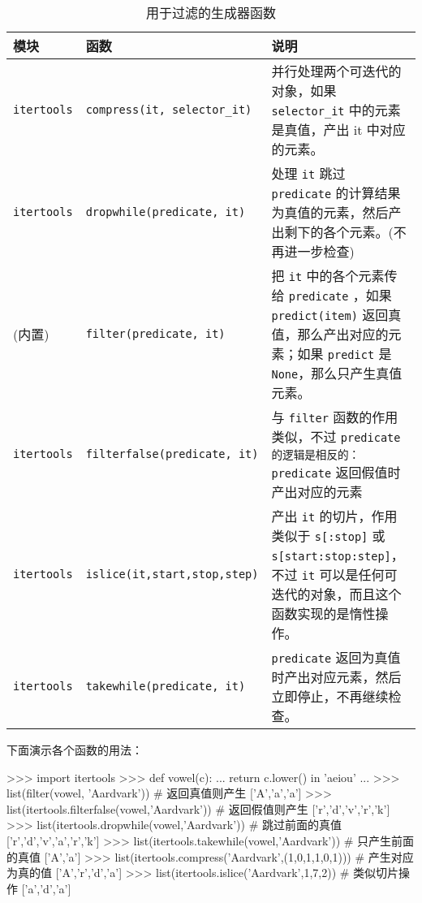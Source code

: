 \begin{table}[H]
    \centering
    \caption{用于过滤的生成器函数}
    \label{table:用于过滤的生成器函数}
    \setlength{\tabcolsep}{2mm}
    \small
    \begin{tabular}{l|l|p{9cm}}
        \toprule
        \textbf{模块} & \textbf{函数} & \textbf{说明} \\
        \midrule
        \texttt{itertools} & \texttt{compress(it, selector\_it)} & 并行处理两个可迭代的对象，如果 \texttt{selector\_it} 中的元素是真值，产出 it 中对应的元素。 \\
        \midrule
        \texttt{itertools} & \texttt{dropwhile(predicate, it)} & 处理 \texttt{it} 跳过 \texttt{predicate} 的计算结果为真值的元素，然后产出剩下的各个元素。(不再进一步检查) \\
        \midrule
        (内置) & \texttt{filter(predicate, it)} & 把 \texttt{it} 中的各个元素传给 \texttt{predicate} ，如果 \texttt{predict(item)} 返回真值，那么产出对应的元素；如果 \texttt{predict} 是 \texttt{None}，那么只产生真值元素。\\
        \midrule
        \texttt{itertools} & \texttt{filterfalse(predicate, it)} & 与 \texttt{filter} 函数的作用类似，不过 \texttt{predicate} \texttt{的逻辑是相反的：predicate} 返回假值时产出对应的元素 \\
        \midrule
        \texttt{itertools} & \texttt{islice(it,start,stop,step)} &  产出 \texttt{it} 的切片，作用类似于 \texttt{s[:stop]} 或 \texttt{s[start:stop:step]}，不过 \texttt{it} 可以是任何可迭代的对象，而且这个函数实现的是惰性操作。 \\
        \midrule
        \texttt{itertools} & \texttt{takewhile(predicate, it)} & \texttt{predicate} 返回为真值时产出对应元素，然后立即停止，不再继续检查。 \\
        \bottomrule
    \end{tabular}
\end{table}

下面演示各个函数的用法：
\begin{python}
>>> import itertools
>>> def vowel(c):
...     return c.lower() in 'aeiou'
... 
>>> list(filter(vowel, 'Aardvark'))     # 返回真值则产生
['A','a','a']
>>> list(itertools.filterfalse(vowel,'Aardvark'))     # 返回假值则产生
['r','d','v','r','k']
>>> list(itertools.dropwhile(vowel,'Aardvark'))     # 跳过前面的真值
['r','d','v','a','r','k']
>>> list(itertools.takewhile(vowel,'Aardvark'))     # 只产生前面的真值
['A','a']
>>> list(itertools.compress('Aardvark',(1,0,1,1,0,1)))  # 产生对应为真的值
['A','r','d','a']
>>> list(itertools.islice('Aardvark',1,7,2))    # 类似切片操作
['a','d','a']
\end{python}

